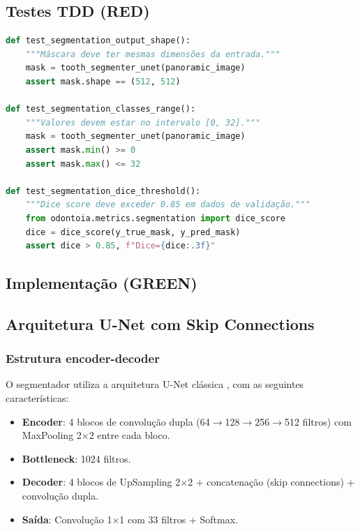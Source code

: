 \subsection{Testes TDD (RED)}

\begin{lstlisting}[language=Python, caption=Projeto 2 — Testes RED para segmentador dental]
def test_segmentation_output_shape():
    """Máscara deve ter mesmas dimensões da entrada."""
    mask = tooth_segmenter_unet(panoramic_image)
    assert mask.shape == (512, 512)

def test_segmentation_classes_range():
    """Valores devem estar no intervalo [0, 32]."""
    mask = tooth_segmenter_unet(panoramic_image)
    assert mask.min() >= 0
    assert mask.max() <= 32

def test_segmentation_dice_threshold():
    """Dice score deve exceder 0.85 em dados de validação."""
    from odontoia.metrics.segmentation import dice_score
    dice = dice_score(y_true_mask, y_pred_mask)
    assert dice > 0.85, f"Dice={dice:.3f}"
\end{lstlisting}

\subsection{Implementação (GREEN)}


\subsection{Arquitetura U-Net com Skip Connections}

\subsubsection{Estrutura encoder-decoder}

O segmentador utiliza a arquitetura U-Net clássica \cite{ronneberger2015u},
com as seguintes características:

\begin{itemize}
  \item \textbf{Encoder}: 4 blocos de convolução dupla (64$\rightarrow$128$\rightarrow$256$\rightarrow$512 filtros)
    com MaxPooling 2$\times$2 entre cada bloco.
  \item \textbf{Bottleneck}: 1024 filtros.
  \item \textbf{Decoder}: 4 blocos de UpSampling 2$\times$2 + concatenação
    (skip connections) + convolução dupla.
  \item \textbf{Saída}: Convolução 1$\times$1 com 33 filtros + Softmax.
\end{itemize}

